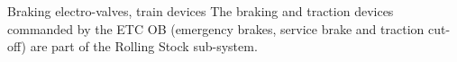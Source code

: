 \documentclass[oneside]{template/openetcs_report}
\begin{document}
Braking electro-valves, train devices The braking and traction devices commanded by the ETC OB (emergency brakes, service brake and traction cut-off) are part of the Rolling Stock sub-system.

%




\clearpage
\printglossary[type=\acronymtype, title=Acronyms, nonumberlist=true, style=altlong4colwithindent]
\end{document}
